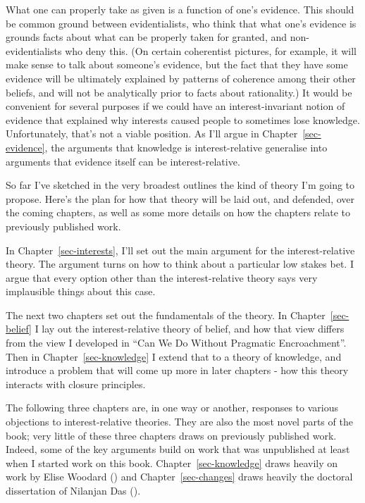 \documentclass[
  10pt,
  letterpaper,
  twoside]{scrbook}
\begin{document}
What one can properly take as given is a function of one's evidence.
This should be common ground between evidentialists, who think that what
one's evidence is grounds facts about what can be properly taken for
granted, and non-evidentialists who deny this. (On certain coherentist
pictures, for example, it will make sense to talk about someone's
evidence, but the fact that they have some evidence will be ultimately
explained by patterns of coherence among their other beliefs, and will
not be analytically prior to facts about rationality.) It would be
convenient for several purposes if we could have an interest-invariant
notion of evidence that explained why interests caused people to
sometimes lose knowledge. Unfortunately, that's not a viable position.
As I'll argue in Chapter~\ref{sec-evidence}, the arguments that
knowledge is interest-relative generalise into arguments that evidence
itself can be interest-relative.

So far I've sketched in the very broadest outlines the kind of theory
I'm going to propose. Here's the plan for how that theory will be laid
out, and defended, over the coming chapters, as well as some more
details on how the chapters relate to previously published work.

In Chapter~\ref{sec-interests}, I'll set out the main argument for the
interest-relative theory. The argument turns on how to think about a
particular low stakes bet. I argue that every option other than the
interest-relative theory says very implausible things about this case.

The next two chapters set out the fundamentals of the theory. In
Chapter~\ref{sec-belief} I lay out the interest-relative theory of
belief, and how that view differs from the view I developed in ``Can We
Do Without Pragmatic Encroachment''. Then in Chapter~\ref{sec-knowledge}
I extend that to a theory of knowledge, and introduce a problem that
will come up more in later chapters - how this theory interacts with
closure principles.

The following three chapters are, in one way or another, responses to
various objections to interest-relative theories. They are also the most
novel parts of the book; very little of these three chapters draws on
previously published work. Indeed, some of the key arguments build on
work that was unpublished at least when I started work on this book.
Chapter~\ref{sec-knowledge} draws heavily on work by Elise Woodard
() and Chapter~\ref{sec-changes} draws
heavily the doctoral dissertation of Nilanjan Das
().
\end{document}
